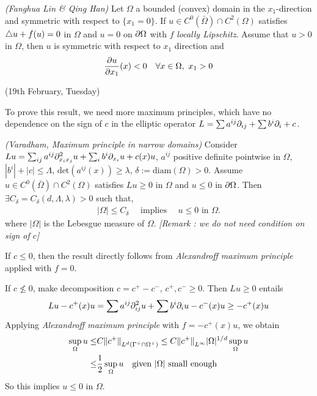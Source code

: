 \documentclass[12pt,a4paper]{article}
\newenvironment{proof}
{\begin{changemargin}{0.5cm}{0.5cm} 
	}%
	{\end{changemargin}
}
\newenvironment{p}
{\begin{proof} 
	}%
	{\end{proof}
}
\begin{document}
\lem \emph{(Fanghua Lin \& Qing Han)} Let $\Omega$ a bounded (convex) domain in the $x_1$-direction and symmetric with respect to $\{x_1 =0 \}$. If $u\in C^0(\bar{\Omega}) \cap C^2(\Omega)$ satisfies $\triangle u + f(u) =0$ in $\Omega$ and $u =0$ on $\partial \Omega$ with $f$ \emph{locally Lipschitz}. Assume that $u>0$ in $\Omega$, then $u$ is symmetric with respect to $x_1$ direction and
\begin{align*}
\frac{\partial u}{\partial x_1}(x) < 0 \quad \forall x\in \Omega, \,\, x_1>0
\end{align*}
\s

\newday

(19th February, Tuesday)
\s

To prove this result, we need more maximum principles, which have no dependence on the sign of $c$ in the elliptic operator $L = \sum a^{ij} \partial_{ij} + \sum b^i \partial_i + c$.
\s

\thm \emph{(Varadham, Maximum principle in narrow domains)} Consider $Lu = \sum_{ij}a^{ij} \partial^2_{x_i x_j} u + \sum_i b^i \partial_{x_i} u + c(x) u$, $a^{ij}$ positive definite pointwise in $\Omega$, $|b^i| + |c| \leq \Lambda$, $\text{det}(a^{ij}(x)) \geq \lambda$, $\delta := \text{diam}(\Omega)>0$. Assume $u \in C^0(\bar{\Omega}) \cap C^2(\Omega)$ satisfies $Lu \geq 0$ in $\Omega$ and $u\leq 0$ in $\partial \Omega$. Then $\exists C_{\delta} = C_{\delta}(d, \Lambda, \lambda) >0$ such that,
\begin{align*}
|\Omega|\leq C_{\delta} \quad \text{ implies } \quad u\leq 0\,\, \text{in } \Omega.
\end{align*}
where $|\Omega|$ is the Lebesgue measure of $\Omega$.
\emph{[Remark : we do not need condition on sign of $c$]}
\begin{p}
\pf If $c\leq 0$, then the result directly follows from \emph{Alexandroff maximum principle} applied with $f=0$.
\s

If $c\not\leq 0$, make decomposition $c= c^+ - c^-$, $c^+, c^- \geq 0$. Then $Lu \geq 0$ entails
\begin{align*}
Lu - c^+(x)u = \sum a^{ij} \partial^2_{ij} u + \sum b^i \partial_i u - c^-(x) u  \geq -c^+(x) u
\end{align*}
Applying \emph{Alexandroff maximum principle} with $f= -c^+(x) u$, we obtain
\begin{align*}
\sup_{\Omega} u \leq & C \snorms{c^+ }{L^d (\Gamma^+ \cap \Omega^+)} \leq  C \snorms{c^+}{L^{\infty}} |\Omega|^{1/d} \sup_{\Omega} u \\
\leq & \frac{1}{2} \sup_{\Omega} u \quad \text{given } |\Omega| \text{ small enough}
\end{align*}
So this implies $u\leq 0$ in $\Omega$.

\eop
\end{p}
\s
\end{document}
